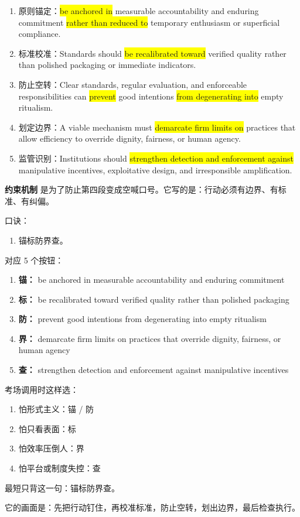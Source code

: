 ﻿\documentclass[lang=cn,11pt]{elegantbook}
\begin{document}
\begin{enumerate}
    \item 原则锚定：\colorbox{yellow}{be anchored in} measurable accountability and enduring commitment \colorbox{yellow}{rather than reduced to} temporary enthusiasm or superficial compliance.
    \item 标准校准：Standards should \colorbox{yellow}{be recalibrated toward} verified quality rather than polished packaging or immediate indicators.
    \item 防止空转：Clear standards, regular evaluation, and enforceable responsibilities can \colorbox{yellow}{prevent} good intentions \colorbox{yellow}{from degenerating into} empty ritualism.
    \item 划定边界：A viable mechanism must \colorbox{yellow}{demarcate firm limits on} practices that allow efficiency to override dignity, fairness, or human agency.
    \item 监管识别：Institutions should \colorbox{yellow}{strengthen detection and enforcement against} manipulative incentives, exploitative design, and irresponsible amplification.
\end{enumerate}

\begin{note}
\textbf{约束机制} 是为了防止第四段变成空喊口号。它写的是：行动必须有边界、有标准、有纠偏。

口诀：

\begin{enumerate}
  \item 锚标防界查。
\end{enumerate}

对应 5 个按钮：

\begin{enumerate}
  \item \textbf{锚：} be anchored in measurable accountability and enduring commitment
  \item \textbf{标：} be recalibrated toward verified quality rather than polished packaging
  \item \textbf{防：} prevent good intentions from degenerating into empty ritualism
  \item \textbf{界：} demarcate firm limits on practices that override dignity, fairness, or human agency
  \item \textbf{查：} strengthen detection and enforcement against manipulative incentives
\end{enumerate}

考场调用时这样选：

\begin{enumerate}
  \item 怕形式主义：锚 / 防
  \item 怕只看表面：标
  \item 怕效率压倒人：界
  \item 怕平台或制度失控：查
\end{enumerate}

最短只背这一句：锚标防界查。

它的画面是：先把行动钉住，再校准标准，防止空转，划出边界，最后检查执行。
\end{note}
\end{document}
